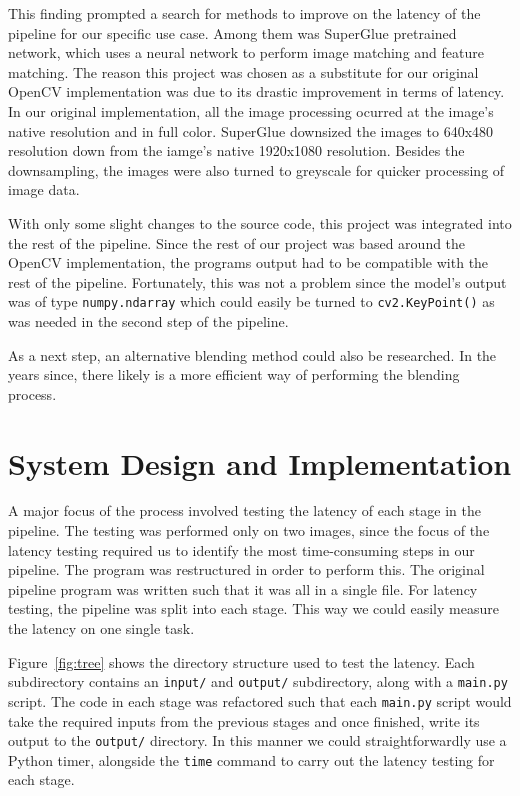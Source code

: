 \documentclass[12pt, a4paper]{article}
\begin{document}
This finding prompted a search for methods to improve on the latency of the pipeline for our 
specific use case. Among them was SuperGlue pretrained network, which uses a neural network
to perform image matching and feature matching. The reason this project was chosen as a 
substitute for our original OpenCV implementation was due to its drastic improvement 
in terms of latency. In our original implementation, all the image processing ocurred at the 
image's native resolution and in full color. SuperGlue downsized the images to 640x480 resolution
down from the iamge's native 1920x1080 resolution. Besides the downsampling, the images
were also turned to greyscale for quicker processing of image data. 

With only some slight changes to the source code, this project was integrated 
into the rest of the pipeline. 
Since the rest of our project was based around the OpenCV implementation, the programs output 
had to be compatible with the  rest of the pipeline. Fortunately, this was not a problem
since the model's output was of type \texttt{numpy.ndarray} which could easily be turned to
\texttt{cv2.KeyPoint()} as was needed in the second step of the pipeline.

As a next step, an alternative blending method could also be researched. In the years since,
there likely is a more efficient way of performing the blending process.

\section{System Design and Implementation}
\label{sec:DesignAndImplementation}

A major focus of the process involved testing the latency of each stage in the pipeline.
The testing was performed only on two images, since the focus of the latency testing
required us to identify the most time-consuming steps in our pipeline. The program
was restructured in order to perform this. The original  pipeline program was written
such that it was all in a single file. For latency testing, the pipeline was split into
each stage. This way we could easily measure the latency on one single task.

Figure~\ref{fig:tree} shows the directory structure used to test the latency. Each subdirectory
contains an \texttt{input/} and \texttt{output/} subdirectory, along with a \texttt{main.py}
script. The code in each stage was refactored such that each \texttt{main.py} script would
take the required inputs from the previous stages and once finished, write its output to
the \texttt{output/} directory. In this manner we could straightforwardly use a Python timer, 
alongside the \texttt{time} command to carry out the latency testing for each stage.
\end{document}
